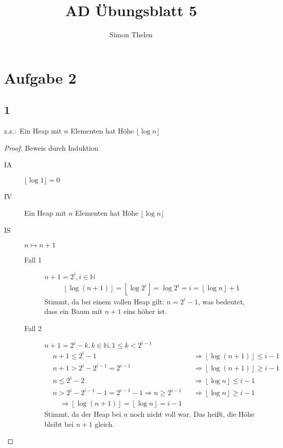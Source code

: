 \documentclass[a4paper]{article}
\title{AD Übungsblatt 5}
\author{Simon Thelen}
\newcommand{\floor}[1]{\left\lfloor{}{#1}\right\rfloor}
\begin{document}
    \maketitle

    \section*{Aufgabe 2}
    \label{sec:aufgabe2}

    \subsection*{1}
    \label{subsec:aufgabe2_1}
    z.z.:\  Ein Heap mit $n$ Elementen hat Höhe $\lfloor\log{n}\rfloor$
    \begin{proof}
        Beweis durch Induktion

        \begin{description}
            \item[IA] $\lfloor\log{1}\rfloor = 0$
            \item[IV] Ein Heap mit $n$ Elementen hat Höhe $\lfloor\log{n}\rfloor$
            \item[IS] $n \longmapsto n + 1$
            \begin{description}
                \item[Fall 1] $n + 1 = 2^i, i \in \mathbb{N}$
                \begin{gather*}
                    \floor{\log{(n + 1)}} = \floor{\log{2^i}} = \log{2^i} = i = \floor{\log{n}} + 1
                \end{gather*}
                Stimmt, da bei einem vollen Heap gilt: $n = 2^i - 1$, was bedeutet, dass ein Baum mit $n + 1$ eins höher ist.
                \item[Fall 2] $n + 1 = 2^i - k, k \in \mathbb{N}, 1 \leq k < 2^{i - 1}$
                \begin{align*}
                    &n + 1 \leq 2^i - 1 &&\Rightarrow \floor{\log{(n + 1)}} \leq i - 1 \\
                    &n + 1 > 2^i - 2^{i - 1} = 2^{i - 1} &&\Rightarrow \floor{\log{(n + 1)}} \geq i - 1 \\
                    &n \leq 2^i - 2 &&\Rightarrow \floor{\log{n}} \leq i - 1 \\
                    &n > 2^i - 2^{i - 1} - 1 = 2^{i - 1} - 1 \Rightarrow n \geq 2^{i - 1} &&\Rightarrow \floor{\log{n}} \geq i - 1 \\
                    &\quad\Rightarrow \floor{\log{(n + 1)}} = \floor{\log{n}} = i - 1
                \end{align*}
                Stimmt, da der Heap bei $n$ noch nicht voll war. Das heißt, die Höhe bleibt bei $n + 1$ gleich.
            \end{description}
        \end{description}
    \end{proof}
\end{document}
